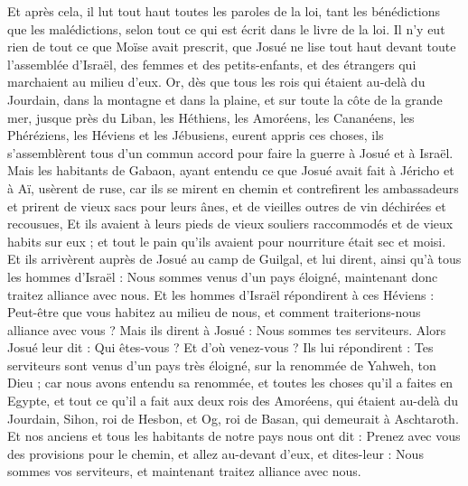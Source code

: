 \begin{multicols}{2}
Et après cela, il lut tout haut toutes les paroles de la loi, tant les bénédictions que les malédictions, selon tout ce qui est écrit dans le livre de la loi.
Il n'y eut rien de tout ce que Moïse avait prescrit, que Josué ne lise tout haut devant toute l'assemblée d'Israël, des femmes et des petits-enfants, et des étrangers qui marchaient au milieu d'eux.
\VerseOne{}Or, dès que tous les rois qui étaient au-delà du Jourdain, dans la montagne et dans la plaine, et sur toute la côte de la grande mer, jusque près du Liban, les Héthiens, les Amoréens, les Cananéens, les Phéréziens, les Héviens et les Jébusiens, eurent appris ces choses,
ils s'assemblèrent tous d'un commun accord pour faire la guerre à Josué et à Israël.
Mais les habitants de Gabaon, ayant entendu ce que Josué avait fait à Jéricho et à Aï,
usèrent de ruse, car ils se mirent en chemin et contrefirent les ambassadeurs et prirent de vieux sacs pour leurs ânes, et de vieilles outres de vin déchirées et recousues,
Et ils avaient à leurs pieds de vieux souliers raccommodés et de vieux habits sur eux ; et tout le pain qu'ils avaient pour nourriture était sec et moisi.
Et ils arrivèrent auprès de Josué au camp de Guilgal, et lui dirent, ainsi qu'à tous les hommes d'Israël : Nous sommes venus d'un pays éloigné, maintenant donc traitez alliance avec nous.
Et les hommes d'Israël répondirent à ces Héviens : Peut-être que vous habitez au milieu de nous, et comment traiterions-nous alliance avec vous ?
Mais ils dirent à Josué : Nous sommes tes serviteurs. Alors Josué leur dit : Qui êtes-vous ? Et d'où venez-vous ?
Ils lui répondirent : Tes serviteurs sont venus d'un pays très éloigné, sur la renommée de Yahweh, ton Dieu ; car nous avons entendu sa renommée, et toutes les choses qu'il a faites en Egypte,
et tout ce qu'il a fait aux deux rois des Amoréens, qui étaient au-delà du Jourdain, Sihon, roi de Hesbon, et Og, roi de Basan, qui demeurait à Aschtaroth.
Et nos anciens et tous les habitants de notre pays nous ont dit : Prenez avec vous des provisions pour le chemin, et allez au-devant d'eux, et dites-leur : Nous sommes vos serviteurs, et maintenant traitez alliance avec nous.

\end{multicols}
